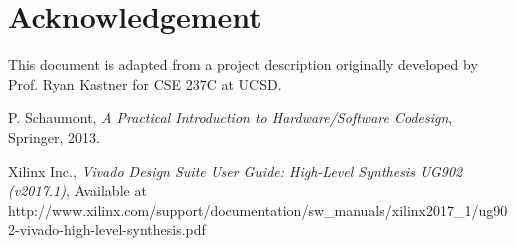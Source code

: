 \documentclass[paper=letter, fontsize=11.6pt]{scrartcl} %
\numberwithin{equation}{section} %
\numberwithin{figure}{section} %
\numberwithin{table}{section} %
\begin{document}



\section{Acknowledgement}
This document is adapted from a project description originally developed by Prof. Ryan Kastner for CSE 237C at UCSD. 

\begin{thebibliography}{9}

  P. Schaumont,
  \emph{A Practical Introduction to Hardware/Software Codesign},
  Springer,
  2013.

  Xilinx Inc., \emph{Vivado Design Suite User Guide: High-Level Synthesis UG902 (v2017.1)},
  Available at http://www.xilinx.com/support/documentation/sw\_manuals/xilinx2017\_1/ug902-vivado-high-level-synthesis.pdf
 


\end{thebibliography}
\end{document}
